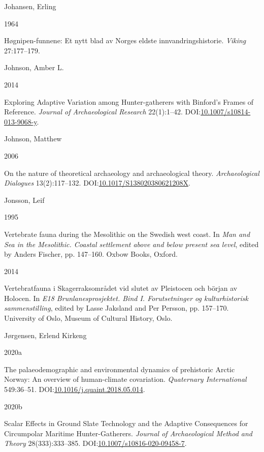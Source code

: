 \documentclass[
  12pt,
  a4paper,
  oneside]{book}
\newlength{\cslhangindent}
\newlength{\csllabelwidth}
\newlength{\cslentryspacingunit} %
\newenvironment{CSLReferences}[2] %
 {%
  \setlength{\parindent}{0pt}
  \ifodd #1
  \let\oldpar\par
  \def\par{\hangindent=\cslhangindent\oldpar}
  \fi
  \setlength{\parskip}{#2\cslentryspacingunit}
 }%
 {}
\newcommand{\CSLBlock}[1]{#1\hfill\break}
\newcommand{\CSLLeftMargin}[1]{\parbox[t]{\csllabelwidth}{#1}}
\newcommand{\CSLRightInline}[1]{\parbox[t]{\linewidth - \csllabelwidth}{#1}\break}
\begin{document}
\begin{CSLReferences}{0}{0}
\leavevmode{}%
\CSLBlock{Johansen, Erling}
\CSLLeftMargin{ 1964}%
\CSLRightInline{{Høgnipen-funnene: Et nytt blad av Norges eldste innvandringshistorie}. \emph{Viking} 27:177--179.}

\leavevmode{}%
\CSLBlock{Johnson, Amber L.}
\CSLLeftMargin{ 2014}%
\CSLRightInline{{Exploring Adaptive Variation among Hunter-gatherers with Binford's Frames of Reference}. \emph{Journal of Archaeological Research} 22(1):1--42. DOI:\href{https://doi.org/10.1007/s10814-013-9068-y}{10.1007/s10814-013-9068-y}.}

\leavevmode{}%
\CSLBlock{Johnson, Matthew}
\CSLLeftMargin{ 2006}%
\CSLRightInline{{On the nature of theoretical archaeology and archaeological theory}. \emph{Archaeological Dialogues} 13(2):117--132. DOI:\href{https://doi.org/10.1017/S138020380621208X}{10.1017/S138020380621208X}.}

\leavevmode{}%
\CSLBlock{Jonsson, Leif}
\CSLLeftMargin{ 1995}%
\CSLRightInline{{Vertebrate fauna during the Mesolithic on the Swedish west coast}. In \emph{{Man and Sea in the Mesolithic. Coastal settlement above and below present sea level}}, edited by Anders Fischer, pp. 147--160. Oxbow Books, Oxford.}

\leavevmode{}%
\CSLLeftMargin{ 2014 }%
\CSLRightInline{{Vertebratfauna i Skagerraksområdet vid slutet av Pleistocen och början av Holocen}. In \emph{{E18 Brunlanesprosjektet. Bind I. Forutsetninger og kulturhistorisk sammenstilling}}, edited by Lasse Jaksland and Per Persson, pp. 157--170. University of Oslo, Museum of Cultural History, Oslo.}

\leavevmode{}%
\CSLBlock{Jørgensen, Erlend Kirkeng}
\CSLLeftMargin{ 2020a}%
\CSLRightInline{{The palaeodemographic and environmental dynamics of prehistoric Arctic Norway: An overview of human-climate covariation}. \emph{Quaternary International} 549:36--51. DOI:\href{https://doi.org/10.1016/j.quaint.2018.05.014}{10.1016/j.quaint.2018.05.014}.}

\leavevmode{}%
\CSLLeftMargin{ 2020b }%
\CSLRightInline{{Scalar Effects in Ground Slate Technology and the Adaptive Consequences for Circumpolar Maritime Hunter-Gatherers}. \emph{Journal of Archaeological Method and Theory} 28(333):333--385. DOI:\href{https://doi.org/10.1007/s10816-020-09458-7}{10.1007/s10816-020-09458-7}.}


\end{CSLReferences}
\end{document}
